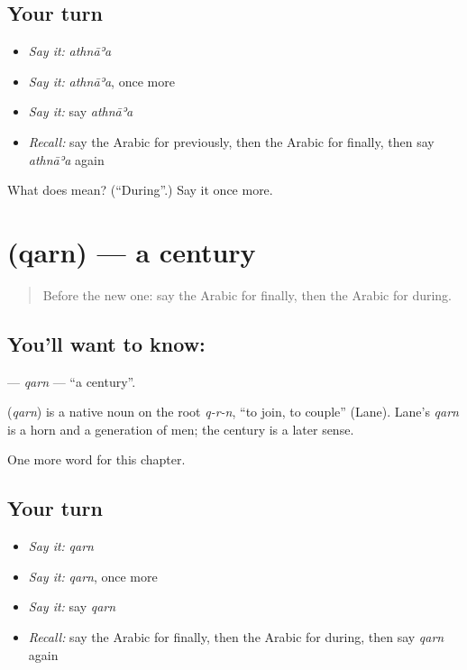 \subsection*{Your turn}
\begin{itemize}
\raggedright
  \item \emph{Say it:} \emph{athnāʾa}
  \item \emph{Say it:} \emph{athnāʾa}, once more
  \item \emph{Say it:} say \emph{athnāʾa}
  \item \emph{Recall:} say the Arabic for previously, then the Arabic for finally, then say \emph{athnāʾa} again
\end{itemize}

\begin{tcolorbox}[breakable,colback=teal!4,colframe=teal!35!black,title={Before you move on}]
What does  mean? (\textquotedblleft{}During\textquotedblright{}.) Say it once more.
\end{tcolorbox}
\section[\texorpdfstring{\ar{قرن} (qarn)}{قرن (qarn)}]{ (qarn) — a century}

\label{lesson:AR-C203-qarn}



\begin{quote}
Before the new one: say the Arabic for finally, then the Arabic for during.
\end{quote}

\subsection*{You'll want to know: }
\textbf{} — \emph{qarn} — \textquotedblleft{}a century\textquotedblright{}.

\begin{cousinweb}
\textbf{} (\emph{qarn}) is a native noun on the root \emph{q-r-n}, \textquotedblleft{}to join, to couple\textquotedblright{} (Lane). Lane's \emph{qarn} is a horn and a generation of men; the century is a later sense.
\end{cousinweb}

\begin{grammarlens}[title={What you've built}]
One more word for this chapter.
\end{grammarlens}

\subsection*{Your turn}
\begin{itemize}
\raggedright
  \item \emph{Say it:} \emph{qarn}
  \item \emph{Say it:} \emph{qarn}, once more
  \item \emph{Say it:} say \emph{qarn}
  \item \emph{Recall:} say the Arabic for finally, then the Arabic for during, then say \emph{qarn} again
\end{itemize}

